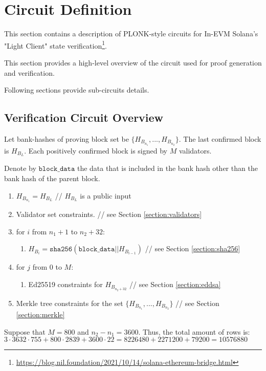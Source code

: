 \section{Circuit Definition}
\label{section:circuit}
This section contains a description of PLONK-style circuits for In-EVM Solana's
"Light Client" state verification\footnote{\url{https://blog.nil.foundation/2021/10/14/solana-ethereum-bridge.html}}.

This section provides a high-level overview of the circuit used for proof generation
and verification.

Following sections provide sub-circuits details.

\subsection{Verification Circuit Overview}

Let bank-hashes of proving block set be $\{H_{B_{n_1}}, ..., H_{B_{n_2}}\}$.
The last confirmed block is $H_{B_{L}}$.
Each positively confirmed block is signed by $M$ validators.

Denote by $\texttt{block\_data}$ the data that is included in the bank hash other than the bank hash of the parent block.

\begin{enumerate}
    \item $H_{B_{n_1}} = H_{B_{L}}$ // $ H_{B_{L}}$ is a public input
    \item Validator set constraints. // see Section \ref{section:validators}
    \item for $i$ from $n_1 + 1$ to $n_2 + 32$:
    \begin{enumerate}
        \item $H_{B_i} = \texttt{sha256}(\texttt{block\_data} || H_{B_{i - 1}})$ // see Section \ref{section:sha256}
    \end{enumerate}
    \item for $j$ from $0$ to $M$:
    \begin{enumerate}
        \item Ed25519 constraints for $H_{B_{n_2 + 32}}$ // see Section \ref{section:eddsa}
    \end{enumerate}
    \item Merkle tree constraints for the set $\{H_{B_{n_1}}, ..., H_{B_{n_2}}\}$ // see Section \ref{section:merkle}
\end{enumerate}

Suppose that $M = 800$ and $n_2 - n_1 = 3600$.
Thus, the total amount of rows is: $3 \cdot 3632 \cdot 755 + 800 \cdot 2839 + 3600 \cdot 22 = 8 226 480 + 2 271 200 + 79 200 = 10 576 880$
